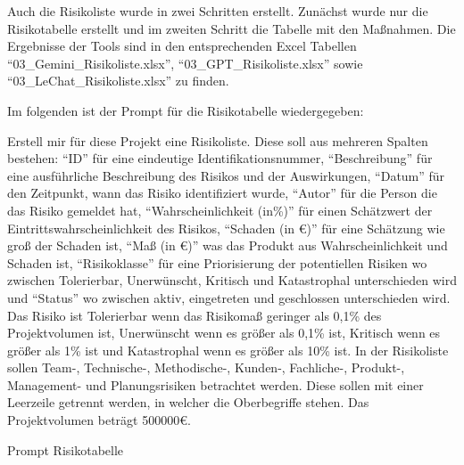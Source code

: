 Auch die Risikoliste wurde in zwei Schritten erstellt. Zunächst wurde nur die Risikotabelle erstellt und im zweiten 
Schritt die Tabelle mit den Maßnahmen. Die Ergebnisse der Tools sind in den entsprechenden Excel Tabellen 
``03\_Gemini\_Risikoliste.xlsx'', ``03\_GPT\_Risikoliste.xlsx'' sowie ``03\_LeChat\_Risikoliste.xlsx'' zu finden.

Im folgenden ist der Prompt für die Risikotabelle wiedergegeben:

\begin{prompt}[H]
    \begin{tcolorbox}[colback=gray!20, colframe=gray!20, boxrule=0pt, sharp corners] 
        Erstell mir für diese Projekt eine Risikoliste. Diese soll aus mehreren Spalten bestehen: ``ID'' für eine 
        eindeutige Identifikationsnummer, ``Beschreibung'' für eine ausführliche Beschreibung des Risikos und der 
        Auswirkungen, ``Datum'' für den Zeitpunkt, wann das Risiko identifiziert wurde, ``Autor'' für die Person die 
        das Risiko gemeldet hat, ``Wahrscheinlichkeit (in\%)'' für einen Schätzwert der Eintrittswahrscheinlichkeit 
        des Risikos, ``Schaden (in €)'' für eine Schätzung wie groß der Schaden ist, ``Maß (in €)'' was das Produkt aus 
        Wahrscheinlichkeit und Schaden ist, ``Risikoklasse'' für eine Priorisierung der potentiellen Risiken wo 
        zwischen Tolerierbar, Unerwünscht, Kritisch und Katastrophal unterschieden wird und ``Status'' wo zwischen 
        aktiv, eingetreten und geschlossen unterschieden wird. Das Risiko ist Tolerierbar wenn das Risikomaß geringer 
        als 0,1\% des Projektvolumen ist, Unerwünscht wenn es größer als 0,1\% ist, Kritisch wenn es größer als 1\% 
        ist und Katastrophal wenn es größer als 10\% ist. In der Risikoliste sollen Team-, Technische-, Methodische-, 
        Kunden-, Fachliche-, Produkt-, Management- und Planungsrisiken betrachtet werden. Diese sollen mit einer 
        Leerzeile getrennt werden, in welcher die Oberbegriffe stehen. Das Projektvolumen beträgt 500000€.
        \vfill
    \end{tcolorbox}
    \caption{Prompt Risikotabelle}
    \label{Prompt Risikotabelle}
\end{prompt}

